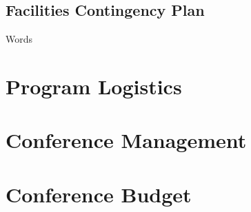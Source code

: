 \documentclass[12pt, letterpaper]{article}
\begin{document}
\subsection{Facilities Contingency Plan}
Words

\newpage
\section{Program Logistics}

\newpage
\section{Conference Management}


\newpage
\section{Conference Budget}
\end{document}
